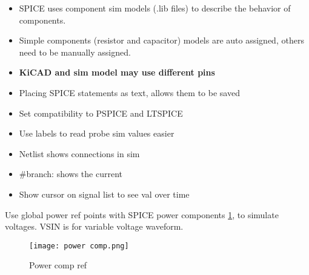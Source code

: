 \documentclass[11pt]{scrartcl} %
\begin{document}
\begin{itemize}
	\item SPICE uses component sim models (.lib files) to describe the behavior of components.
	\item Simple components (resistor and capacitor) models are auto assigned, others need to be manually assigned.
	\item \textbf{KiCAD and sim model may use different pins}
	\item Placing SPICE statements as text, allows them to be saved
	\item Set compatibility to PSPICE and LTSPICE
	\item Use labels to read probe sim values easier
	\item Netlist shows connections in sim
	\item \#branch: shows the current
	\item Show cursor on signal list to see val over time
\end{itemize}

Use global power ref points with SPICE power components \ref{Power comp}, to simulate voltages. VSIN is for variable
voltage waveform. 

\begin{figure}[h] %
	\centering
	\texttt{[image: power comp.png]} %
	\caption{Power comp ref}
	\label{Power comp}
\end{figure}




\end{document}
